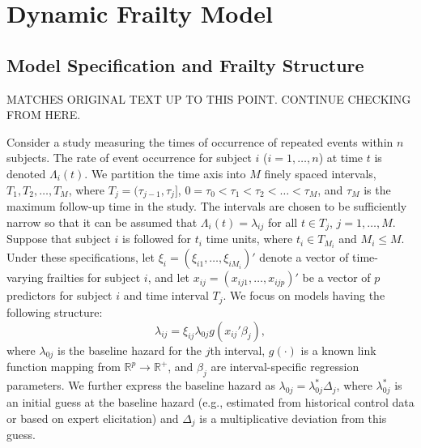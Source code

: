 \documentclass[10pt, letterpaper]{article}
\newcommand{\correctToHere}{{\color{red}\large MATCHES ORIGINAL TEXT UP TO THIS POINT. CONTINUE CHECKING FROM HERE.}}
\begin{document}
\section{Dynamic Frailty Model}

\subsection{Model Specification and Frailty Structure}

\correctToHere

Consider a study measuring the times of occurrence of repeated events within $n$ subjects. The rate of event occurrence for subject $i$ ($i = 1, \dots, n$) at time $t$ is denoted $\Lambda_i(t)$. We partition the time axis into $M$ finely spaced intervals, $T_1, T_2, \dots, T_M$, where $T_j = (\tau_{j-1}, \tau_j]$, $0 = \tau_0 < \tau_1 < \tau_2 < \dots < \tau_M$, and $\tau_M$ is the maximum follow-up time in the study. The intervals are chosen to be sufficiently narrow so that it can be assumed that $\Lambda_i(t) = \lambda_{ij}$ for all $t \in T_j$, $j = 1, \dots, M$.
Suppose that subject $i$ is followed for $t_i$ time units, where $t_i \in T_{M_i}$ and $M_i \le M$. Under these specifications, let $\xi_i = (\xi_{i1}, \dots, \xi_{iM_i})'$ denote a vector of time-varying frailties for subject $i$, and let $x_{ij} = (x_{ij1}, \dots, x_{ijp})'$ be a vector of $p$ predictors for subject $i$ and time interval $T_j$. We focus on models having the following structure:
\begin{equation} \label{eq:1}
\lambda_{ij} = \xi_{ij} \lambda_{0j} g(x_{ij}' \beta_j),
\end{equation}
where $\lambda_{0j}$ is the baseline hazard for the $j$th interval, $g(\cdot)$ is a known link function mapping from $\mathbb{R}^p \to \mathbb{R}^+$, and $\beta_j$ are interval-specific regression parameters. We further express the baseline hazard as $\lambda_{0j} = \lambda_{0j}^* \Delta_j$, where $\lambda_{0j}^*$ is an initial guess at the baseline hazard (e.g., estimated from historical control data or based on expert elicitation) and $\Delta_j$ is a multiplicative deviation from this guess.
\end{document}
